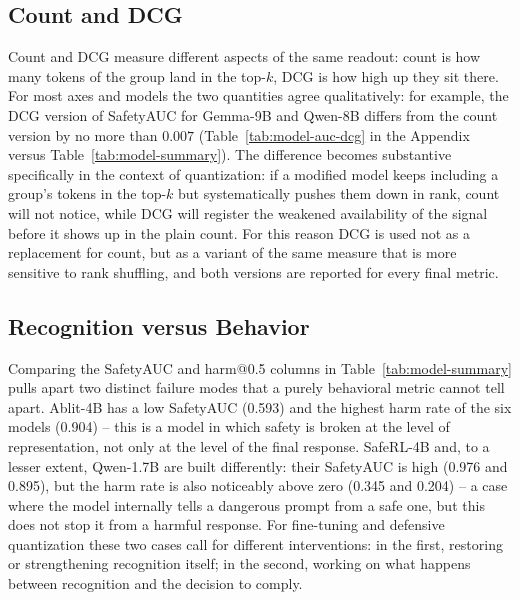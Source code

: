 \documentclass[10pt,twocolumn]{article}
\begin{document}
\subsection{Count and DCG}

Count and DCG measure different aspects of the same readout: count is how many tokens of the
group land in the top-$k$, DCG is how high up they sit there. For most axes
and models the two quantities agree qualitatively: for example, the DCG version of SafetyAUC for
Gemma-9B and Qwen-8B differs from the count version by no more than $0.007$
(Table~\ref{tab:model-auc-dcg} in the Appendix versus Table~\ref{tab:model-summary}). The difference
becomes substantive specifically in the context of quantization: if a modified model keeps
including a group's tokens in the top-$k$ but systematically pushes them down in rank, count will
not notice, while DCG will register the weakened availability of the signal before it
shows up in the plain count. For this reason DCG is used not as a replacement for count, but as a
variant of the same measure that is more sensitive to rank shuffling, and both versions are reported for
every final metric.

\subsection{Recognition versus Behavior}

Comparing the SafetyAUC and harm@0.5 columns in Table~\ref{tab:model-summary} pulls apart two
distinct failure modes that a purely behavioral metric cannot tell apart. Ablit-4B has a
low SafetyAUC (0.593) and the highest harm rate of the six models (0.904) -- this is a model in
which safety is broken at the level of representation, not only at the level of the final
response. SafeRL-4B and, to a lesser extent, Qwen-1.7B are built differently: their SafetyAUC is high
(0.976 and 0.895), but the harm rate is also noticeably above zero (0.345 and 0.204) -- a case where
the model internally tells a dangerous prompt from a safe one, but this does not stop it from a harmful
response. For fine-tuning and defensive quantization these two cases call for
different interventions: in the first, restoring or strengthening recognition itself; in the second, working on what
happens between recognition and the decision to comply.
\end{document}
